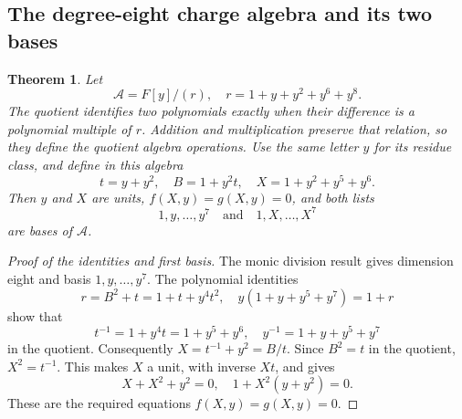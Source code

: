 \documentclass{article}
\newtheorem{theorem}{Theorem}
\begin{document}
\subsection{The degree-eight charge algebra and its two bases}\label{app:charge-algebra}

\begin{theorem}\label{thm:charge-algebra}
  Let
  \begin{equation}
    \mathcal{A} = F[y]/(r), \quad r = 1 + y + y^2 + y^6 + y^8.
  \end{equation}
  The quotient identifies two polynomials exactly when their difference is
  a polynomial multiple of \(r\). Addition and multiplication preserve that
  relation, so they define the quotient algebra operations.
  Use the same letter \(y\) for its residue class, and define in this algebra
  \begin{equation}
    t = y + y^2, \quad B = 1 + y^2 t, \quad
    X = 1 + y^2 + y^5 + y^6.
  \end{equation}
  Then \(y\) and \(X\) are units, \(f(X,y) = g(X,y) = 0\), and both lists
  \begin{equation}
    1, y, \dots, y^7 \quad \text{and} \quad 1, X, \dots, X^7
  \end{equation}
  are bases of \(\mathcal{A}\).
\end{theorem}

\begin{proof}[Proof of the identities and first basis]  The monic division result
  gives dimension eight and basis \(1, y, \dots, y^7\).
  The polynomial identities
  \begin{equation}
    r = B^2 + t = 1 + t + y^4 t^2,
    \quad y(1 + y + y^5 + y^7) = 1 + r
  \end{equation}
  show that
  \begin{equation}
    t^{-1} = 1 + y^4 t = 1 + y^5 + y^6,
    \quad y^{-1} = 1 + y + y^5 + y^7
  \end{equation}
  in the quotient. Consequently \(X = t^{-1} + y^2 = B/t\).
  Since \(B^2 = t\) in the quotient,
  \(X^2 = t^{-1}\). This makes \(X\) a unit, with inverse \(Xt\), and gives
  \begin{equation}
    X + X^2 + y^2 = 0, \quad 1 + X^2 (y + y^2) = 0.
  \end{equation}
  These are the required equations \(f(X,y) = g(X,y) = 0\).
\end{proof}
\end{document}

